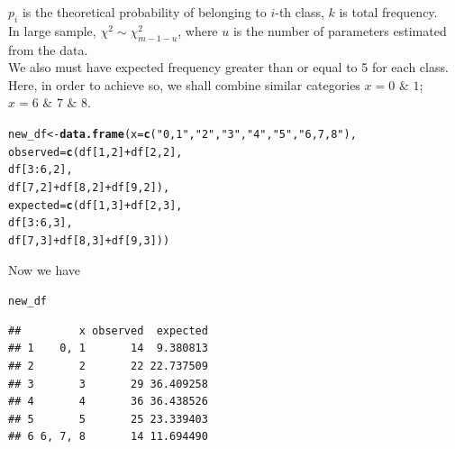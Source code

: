 \documentclass[11pt, a4paper]{article}\usepackage[]{graphicx}\usepackage[]{xcolor}
\makeatletter
\newcommand{\hlnum}[1]{\textcolor[rgb]{0.686,0.059,0.569}{#1}}%
\newcommand{\hlsng}[1]{\textcolor[rgb]{0.192,0.494,0.8}{#1}}%
\newcommand{\hlopt}[1]{\textcolor[rgb]{0,0,0}{#1}}%
\newcommand{\hldef}[1]{\textcolor[rgb]{0.345,0.345,0.345}{#1}}%
\newcommand{\hlkwb}[1]{\textcolor[rgb]{0.69,0.353,0.396}{#1}}%
\newcommand{\hlkwc}[1]{\textcolor[rgb]{0.333,0.667,0.333}{#1}}%
\newcommand{\hlkwd}[1]{\textcolor[rgb]{0.737,0.353,0.396}{\textbf{#1}}}%
\newenvironment{kframe}{%
 \def\at@end@of@kframe{}%
 \ifinner\ifhmode%
  \def\at@end@of@kframe{\end{minipage}}%
  \begin{minipage}{\columnwidth}%
 \fi\fi%
 \def\FrameCommand##1{\hskip\@totalleftmargin \hskip-\fboxsep
 \colorbox{shadecolor}{##1}\hskip-\fboxsep
     \hskip-\linewidth \hskip-\@totalleftmargin \hskip\columnwidth}%
 \MakeFramed {\advance\hsize-\width
   \@totalleftmargin\z@ \linewidth\hsize
   \@setminipage}}%
 {\par\unskip\endMakeFramed%
 \at@end@of@kframe}
\newenvironment{knitrout}{}{} %
\makeatother
\begin{document}
$p_i$ is the theoretical probability of belonging to $i$-th class, $k$ is total frequency. \\

In large sample, $\chi^2 \sim \chi^2_{m-1-u}$, where $u$ is the number of parameters estimated from the data. \\

We also must have expected frequency greater than or equal to 5 for each class. \\

Here, in order to achieve so, we shall combine similar categories $x = 0 \,\, \& \,\, 1$; $x = 6 \,\, \& \,\, 7 \,\, \& \,\, 8$. \\

\begin{knitrout}
\color{fgcolor}\begin{kframe}
\begin{alltt}
\hldef{new_df} \hlkwb{<-} \hlkwd{data.frame}\hldef{(}\hlkwc{x} \hldef{=} \hlkwd{c}\hldef{(}\hlsng{"0, 1"}\hldef{,} \hlsng{"2"}\hldef{,} \hlsng{"3"}\hldef{,} \hlsng{"4"}\hldef{,} \hlsng{"5"}\hldef{,} \hlsng{"6, 7, 8"}\hldef{),}
                     \hlkwc{observed} \hldef{=} \hlkwd{c}\hldef{(df[}\hlnum{1}\hldef{,} \hlnum{2}\hldef{]} \hlopt{+} \hldef{df[}\hlnum{2}\hldef{,} \hlnum{2}\hldef{],}
                                  \hldef{df[}\hlnum{3}\hlopt{:}\hlnum{6}\hldef{,} \hlnum{2}\hldef{],}
                                  \hldef{df[}\hlnum{7}\hldef{,} \hlnum{2}\hldef{]} \hlopt{+} \hldef{df[}\hlnum{8}\hldef{,} \hlnum{2}\hldef{]} \hlopt{+} \hldef{df[}\hlnum{9}\hldef{,} \hlnum{2}\hldef{]),}
                     \hlkwc{expected} \hldef{=} \hlkwd{c}\hldef{(df[}\hlnum{1}\hldef{,} \hlnum{3}\hldef{]} \hlopt{+} \hldef{df[}\hlnum{2}\hldef{,} \hlnum{3}\hldef{],}
                                  \hldef{df[}\hlnum{3}\hlopt{:}\hlnum{6}\hldef{,} \hlnum{3}\hldef{],}
                                  \hldef{df[}\hlnum{7}\hldef{,} \hlnum{3}\hldef{]} \hlopt{+} \hldef{df[}\hlnum{8}\hldef{,} \hlnum{3}\hldef{]} \hlopt{+} \hldef{df[}\hlnum{9}\hldef{,} \hlnum{3}\hldef{]))}
\end{alltt}
\end{kframe}
\end{knitrout}

Now we have

\begin{knitrout}
\color{fgcolor}\begin{kframe}
\begin{alltt}
\hldef{new_df}
\end{alltt}
\begin{verbatim}
##         x observed  expected
## 1    0, 1       14  9.380813
## 2       2       22 22.737509
## 3       3       29 36.409258
## 4       4       36 36.438526
## 5       5       25 23.339403
## 6 6, 7, 8       14 11.694490
\end{verbatim}
\end{kframe}
\end{knitrout}
\end{document}
